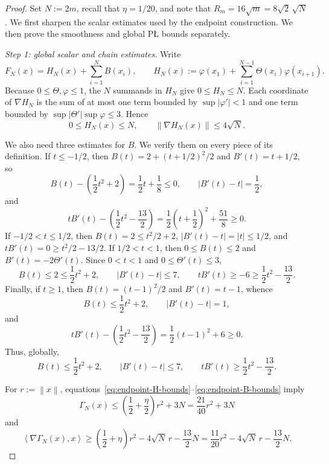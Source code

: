 \documentclass[10pt,a4paper]{amsart}
\newcommand{\abs}[1]{\left\lvert #1\right\rvert}
\newcommand{\ip}[2]{\left\langle #1,#2\right\rangle}
\newcommand{\norm}[1]{\left\lVert #1\right\rVert}
\begin{document}
\begin{proof}
Set $N:=2m$, recall that $\eta=1/20$, and note that
$R_m=16\sqrt m=8\sqrt2\,\sqrt N$. We first sharpen the scalar estimates used by the endpoint construction. We then
prove the smoothness and global P\L{} bounds separately.

\emph{Step 1: global scalar and chain estimates.}
Write
\[
F_N(x)=H_N(x)+\sum_{i=1}^N B(x_i),
\qquad
H_N(x):=\varphi(x_1)+\sum_{i=1}^{N-1}\Theta(x_i)\varphi(x_{i+1}).
\]
Because $0\le\Theta,\varphi\le1$, the $N$ summands in $H_N$ give $0\le H_N\le N$. Each coordinate of
$\nabla H_N$ is the sum of at most one term bounded by $\sup|\varphi'|<1$ and one term bounded by
$\sup|\Theta'|\sup\varphi\le3$. Hence
\begin{equation}
\label{eq:endpoint-H-bounds}
0\le H_N(x)\le N,
\qquad
\norm{\nabla H_N(x)}\le4\sqrt N.
\end{equation}

We also need three estimates for $B$. We verify them on every piece of its definition. If $t\le-1/2$, then
$B(t)=2+(t+1/2)^2/2$ and $B'(t)=t+1/2$, so
\[
B(t)-\left(\frac12t^2+2\right)
=\frac12t+\frac18\le0,
\qquad
\abs{B'(t)-t}=\frac12,
\]
and
\[
tB'(t)-\left(\frac12t^2-\frac{13}{2}\right)
=\frac12\left(t+\frac12\right)^2+\frac{51}{8}\ge0.
\]
If $-1/2<t\le1/2$, then $B(t)=2\le t^2/2+2$, $\abs{B'(t)-t}=\abs{t}\le1/2$, and
$tB'(t)=0\ge t^2/2-13/2$. If
$1/2<t<1$, then $0\le B(t)\le2$ and $B'(t)=-2\Theta'(t)$. Since $0<t<1$ and
$0\le\Theta'(t)\le3$,
\[
B(t)\le2\le\frac12t^2+2,
\qquad
\abs{B'(t)-t}\le7,
\qquad
tB'(t)\ge-6\ge\frac12t^2-\frac{13}{2}.
\]
Finally, if $t\ge1$, then $B(t)=(t-1)^2/2$ and $B'(t)=t-1$, whence
\[
B(t)\le\frac12t^2+2,
\qquad
\abs{B'(t)-t}=1,
\]
and
\[
tB'(t)-\left(\frac12t^2-\frac{13}{2}\right)
=\frac12(t-1)^2+6\ge0.
\]
Thus, globally,
\begin{equation}
\label{eq:endpoint-B-bounds}
B(t)\le\frac12t^2+2,
\qquad
\abs{B'(t)-t}\le7,
\qquad
tB'(t)\ge\frac12t^2-\frac{13}{2}.
\end{equation}

For $r:=\norm{x}$, equations~\eqref{eq:endpoint-H-bounds}--\eqref{eq:endpoint-B-bounds} imply
\begin{equation}
\label{eq:endpoint-Gamma-global-growth}
\Gamma_N(x)
\le
\left(\frac12+\frac{\eta}{2}\right)r^2+3N
=\frac{21}{40}r^2+3N
\end{equation}
and
\begin{equation}
\label{eq:endpoint-Gamma-radial}
\ip{\nabla\Gamma_N(x)}{x}
\ge
\left(\frac12+\eta\right)r^2-4\sqrt N\,r-\frac{13}{2}N
=\frac{11}{20}r^2-4\sqrt N\,r-\frac{13}{2}N.
\end{equation}


\end{proof}
\end{document}
